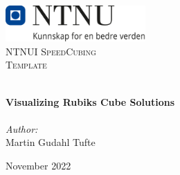 
\begin{titlepage}
\vbox{ }
\vbox{ }
\begin{center}
\includegraphics[width=0.40\textwidth]{Images/NTNU_logo.png}\\[1cm]
\textsc{\LARGE NTNUI SpeedCubing}\\[1.5cm]
\textsc{\Large Template}\\[0.5cm]
\vbox{ }

\HRule \\[0.4cm]
{ \huge \bfseries Visualizing Rubiks Cube Solutions}\\[0.4cm]
\HRule \\[1.5cm]

\large
\emph{Author:}\\
Martin Gudahl Tufte
\vfill

{\large November 2022}
\end{center}
\end{titlepage}